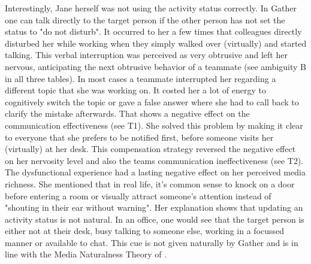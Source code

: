 \documentclass[man]{apa7}
\begin{document}
Interestingly, Jane herself was not using the activity status correctly. In Gather one can talk directly to the target person if the other person has not set the status to "do not disturb". It occurred to her a few times that colleagues directly disturbed her while working when they simply walked over (virtually) and started talking. This verbal interruption was perceived as very obtrusive and left her nervous, anticipating the next obtrusive behavior of a teammate (see ambiguity B in all three tables). In most cases a teammate interrupted her regarding a different topic that she was working on. It costed her a lot of energy to cognitively switch the topic or gave a false answer where she had to call back to clarify the mistake afterwards. That shows a negative effect on the communication effectiveness (see T1). She solved this problem by making it clear to everyone that she prefers to be notified first, before someone visits her (virtually) at her desk. This compensation strategy reversed the negative effect on her nervosity level and also the teams communication ineffectiveness (see T2). The dysfunctional experience had a lasting negative effect on her perceived media richness. She mentioned that in real life, it's common sense to knock on a door before entering a room or visually attract someone's attention instead of "shouting in their ear without warning". Her explanation shows that updating an activity status is not natural. In an office, one would see that the target person is either not at their desk, busy talking to someone else, working in a focussed manner or available to chat. This cue is not given naturally by Gather and is in line with the Media Naturalness Theory of \parencite{Kock2005}.
\end{document}
